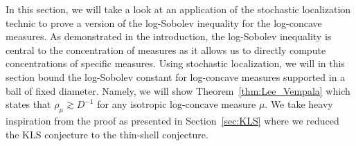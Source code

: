 In this section, we will take a look at an application of the stochastic localization technic 
to prove a version of the log-Sobolev inequality for the log-concave measures. As demonstrated in the 
introduction, the log-Sobolev inequality is central to the concentration of 
measures as it allows us to directly compute concentrations of specific measures. Using stochastic localization, 
we will in this section bound the log-Sobolev constant for log-concave measures 
supported in a ball of fixed diameter. Namely, we will show Theorem~\ref{thm:Lee_Vempala} which states that 
\(\rho_\mu \gtrsim D^{-1}\) for any isotropic log-concave measure \(\mu\). 
We take heavy inspiration from the proof as presented in Section~\ref{sec:KLS}
where we reduced the KLS conjecture to the thin-shell conjecture.




